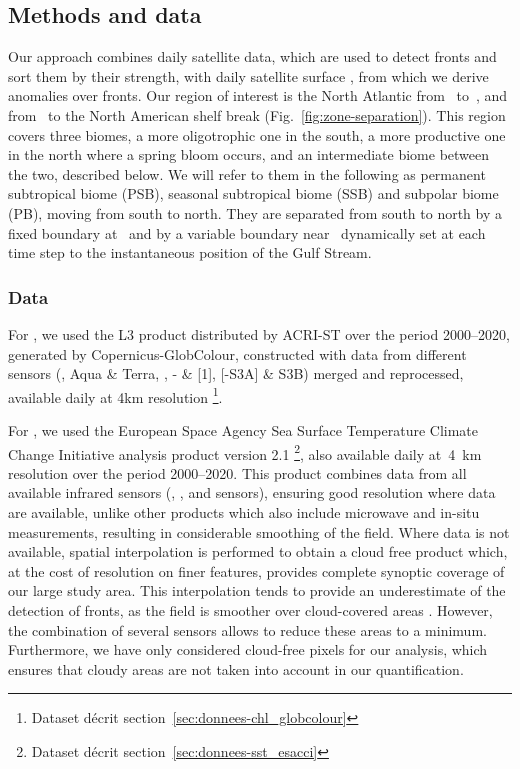 \subsection{Methods and data}

Our approach combines daily satellite  data, which are used to detect fronts and sort them by their strength, with daily satellite surface , from which we derive anomalies over fronts.
Our region of interest is the North Atlantic from~ to~, and from~ to the North American shelf break (Fig.~\ref{fig:zone-separation}).
This region covers three biomes, a more oligotrophic one in the south, a more productive one in the north where a spring bloom occurs, and an intermediate biome between the two, described below.
We will refer to them in the following as permanent subtropical biome (PSB), seasonal subtropical biome (SSB) and subpolar biome (PB), moving from south to north.
They are separated from south to north by a fixed boundary at~ and by a variable boundary near~ dynamically set at each time step to the instantaneous position of the Gulf Stream.

\subsubsection{Data}

For , we used the L3 product distributed by ACRI-ST over the period 2000--2020, generated by Copernicus-GlobColour, constructed with data from different sensors (,  Aqua \& Terra, , - \& [1], [-S3A] \& S3B) merged and reprocessed, available daily at 4km resolution \parencite{article_chl}\footnote{Dataset  décrit section~\ref{sec:donnees-chl_globcolour}}.

For , we used the European Space Agency Sea Surface Temperature Climate Change Initiative analysis product version 2.1 \parencite{merchant_2019, article_sst, good_2020}\footnote{Dataset  décrit section~\ref{sec:donnees-sst_esacci}}, also available daily at~\qty{4}{\km} resolution over the period 2000--2020.
This product combines data from all available infrared sensors (, , and  sensors), ensuring good resolution where data are available, unlike other  products which also include microwave and in-situ measurements, resulting in considerable smoothing of the  field. %
Where  data is not available, spatial interpolation is performed to obtain a cloud free product which, at the cost of resolution on finer features, provides complete synoptic coverage of our large study area.
This interpolation tends to provide an underestimate of the detection of fronts, as the  field is smoother over cloud-covered areas \parencite{merchant_2019}.
However, the combination of several sensors allows to reduce these areas to a minimum.
Furthermore, we have only considered cloud-free pixels for our analysis, which ensures that cloudy areas are not taken into account in our quantification.


